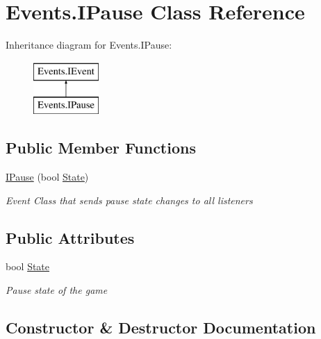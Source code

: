 \hypertarget{class_events_1_1_i_pause}{}\section{Events.\+I\+Pause Class Reference}
\label{class_events_1_1_i_pause}
Inheritance diagram for Events.\+I\+Pause\+:\begin{figure}[H]
\begin{center}
\leavevmode
\includegraphics[height=2.000000cm]{class_events_1_1_i_pause}
\end{center}
\end{figure}
\subsection*{Public Member Functions}
\begin{DoxyCompactItemize}
\item 
\hyperlink{class_events_1_1_i_pause_ad5366754b81dc5bc50f8bc14c62ebaa5}{I\+Pause} (bool \hyperlink{class_events_1_1_i_pause_afc11e9a193f36974f990775429eee9cc}{State})
\begin{DoxyCompactList}\small\item\em Event Class that sends pause state changes to all listeners \end{DoxyCompactList}\end{DoxyCompactItemize}
\subsection*{Public Attributes}
\begin{DoxyCompactItemize}
\item 
bool \hyperlink{class_events_1_1_i_pause_afc11e9a193f36974f990775429eee9cc}{State}
\begin{DoxyCompactList}\small\item\em Pause state of the game \end{DoxyCompactList}\end{DoxyCompactItemize}


\subsection{Constructor \& Destructor Documentation}
